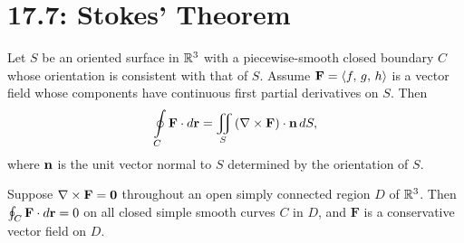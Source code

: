 \documentclass[mathNotesPreamble]{subfiles}
\begin{document}
\section{17.7: Stokes' Theorem}

  \begin{thmBox*}
    Let $S$ be an oriented surface in $\mathbb{R}^3$ with a piecewise-smooth closed boundary $C$ whose orientation is consistent with that of $S$. Assume $\mathbf F={\left\langle f,\,g,\,h \right\rangle}$ is a vector field whose components have continuous first partial derivatives on $S$. Then
      \[\oint\limits_C \mathbf F\cdot d{\mathbf{r}}=\iint\limits_S {\left(\nabla\times\mathbf F\right)}\cdot{\mathbf{n}}\,dS,\]
    where ${\mathbf{n}}$ is the unit vector normal to $S$ determined by the orientation of $S$.
  \end{thmBox*}

  \begin{thmBox*}[Theorem 17.16: Curl $\mathbf F=\bfO$ implies $\mathbf F$ Is Conservative]
    Suppose $\nabla\times\mathbf F=\mathbf{0}$ throughout an open simply connected region $D$ of $\mathbb{R}^3$. Then $\oint_C\mathbf F\cdot d{\mathbf{r}}=0$ on all closed simple smooth curves $C$ in $D$, and $\mathbf F$ is a conservative vector field on $D$.
  \end{thmBox*}

  \pagebreak
  
\end{document}
